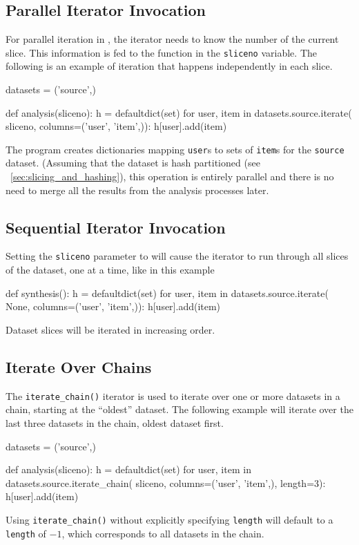 \subsection{Parallel Iterator Invocation}
For parallel iteration in \analysis, the iterator needs to know the
number of the current slice.  This information is fed to the \analysis
function in the \texttt{sliceno} variable. The following is an example
of iteration that happens independently in each slice.
\begin{python}
datasets = ('source',)

def analysis(sliceno):
    h = defaultdict(set)
    for user, item in datasets.source.iterate(
                           sliceno, columns=('user', 'item',)):
        h[user].add(item)
\end{python}
The program creates dictionaries mapping \texttt{user}s to sets of
\texttt{item}s for the \texttt{source} dataset.  (Assuming that
the dataset is hash partitioned (see ~\ref{sec:slicing_and_hashing}),
this operation is entirely parallel and there is no need to merge all
the results from the analysis processes later.



\subsection{Sequential Iterator Invocation}
Setting the \texttt{sliceno} parameter to
\pyNone will cause the iterator to run through all slices of
the dataset, one at a time, like in this example
\begin{python}
def synthesis():
    h = defaultdict(set)
    for user, item in datasets.source.iterate(
                           None, columns=('user', 'item',)):
        h[user].add(item)
\end{python}
Dataset slices will be iterated in increasing order.


\subsection{Iterate Over Chains}
The \texttt{iterate\_chain()} iterator is used to iterate over one or
more datasets in a chain, starting at the ``oldest'' dataset.  The
following example will iterate over the last three datasets in the
chain, oldest dataset first.
\begin{python}
datasets = ('source',)

def analysis(sliceno):
    h = defaultdict(set)
    for user, item in datasets.source.iterate_chain(
                           sliceno, columns=('user', 'item',), length=3):
        h[user].add(item)
\end{python}
Using \texttt{iterate\_chain()} without explicitly specifying
\texttt{length} will default to a \texttt{length} of $-1$, which
corresponds to all datasets in the chain.

